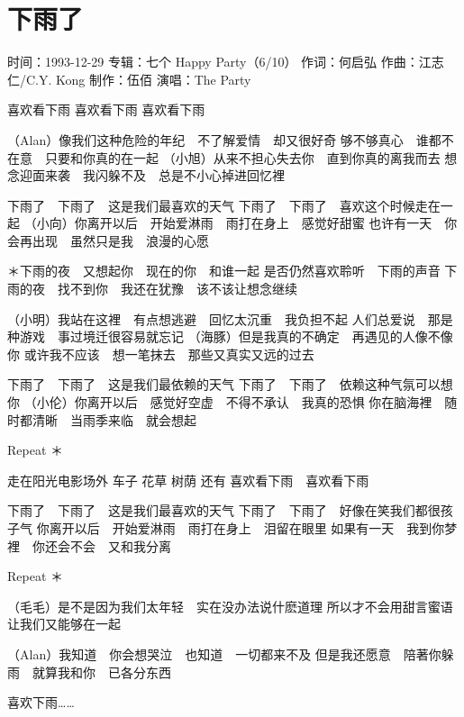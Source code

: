 \documentclass[UTF8,a4paper,oneside,twocolumn,12pt]{ctexbook}
\newcommand{\infopair}[2]{\textbullet #1：#2}
\newcommand{\zc}[1][伍佰]{\infopair{作词}{#1}}
\newcommand{\zq}[1][伍佰]{\infopair{作曲}{#1}}
\newcommand{\zj}[1]{\infopair{专辑}{#1}}
\newcommand{\zz}[1]{\infopair{制作}{#1}}
\newcommand{\sj}[1]{\infopair{时间}{#1}}
\newenvironment{info}{\begin{flushleft}\kaishu
	}
	{\end{flushleft}\normalsize\yahei\par}
\newenvironment{lyric}{
	}
{}
\begin{document}
\section{下雨了}
\begin{info}
	\sj{1993-12-29}
	\zj{七个 Happy Party（6/10）}
	\zc[何启弘]
	\zq[江志仁/C.Y. Kong]
	\zz{伍佰}
	\infopair{演唱}{The Party}
\end{info}
\begin{lyric}
	喜欢看下雨 喜欢看下雨 喜欢看下雨

	（Alan）像我们这种危险的年纪　不了解爱情　却又很好奇
	够不够真心　谁都不在意　只要和你真的在一起
	（小旭）从来不担心失去你　直到你真的离我而去
	想念迎面来袭　我闪躲不及　总是不小心掉进回忆裡

	下雨了　下雨了　这是我们最喜欢的天气
	下雨了　下雨了　喜欢这个时候走在一起
	（小向）你离开以后　开始爱淋雨　雨打在身上　感觉好甜蜜
	也许有一天　你会再出现　虽然只是我　浪漫的心愿

	＊下雨的夜　又想起你　现在的你　和谁一起
	是否仍然喜欢聆听　下雨的声音
	下雨的夜　找不到你　我还在犹豫　该不该让想念继续

	（小明）我站在这裡　有点想逃避　回忆太沉重　我负担不起
	人们总爱说　那是种游戏　事过境迁很容易就忘记
	（海豚）但是我真的不确定　再遇见的人像不像你
	或许我不应该　想一笔抹去　那些又真实又远的过去

	下雨了　下雨了　这是我们最依赖的天气
	下雨了　下雨了　依赖这种气氛可以想你
	（小伦）你离开以后　感觉好空虚　不得不承认　我真的恐惧
	你在脑海裡　随时都清晰　当雨季来临　就会想起

	Repeat ＊

	走在阳光电影场外 车子 花草 树荫 还有
	喜欢看下雨　喜欢看下雨

	下雨了　下雨了　这是我们最喜欢的天气
	下雨了　下雨了　好像在笑我们都很孩子气
	你离开以后　开始爱淋雨　雨打在身上　泪留在眼里
	如果有一天　我到你梦裡　你还会不会　又和我分离

	Repeat ＊

	（毛毛）是不是因为我们太年轻　实在没办法说什麽道理
	所以才不会用甜言蜜语　让我们又能够在一起

	（Alan）我知道　你会想哭泣　也知道　一切都来不及
	但是我还愿意　陪著你躲雨　就算我和你　已各分东西

	喜欢下雨……
\end{lyric}
\end{document}
